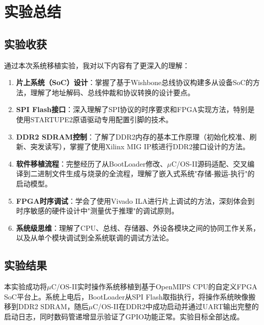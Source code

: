 \section{实验总结}

\subsection{实验收获}

通过本次系统移植实验，我对以下内容有了更深入的理解：

\begin{enumerate}[leftmargin=2em]
    \item \textbf{片上系统（SoC）设计}：掌握了基于Wishbone总线协议构建多从设备SoC的方法，理解了地址解码、总线仲裁和协议转换的设计要点。

    \item \textbf{SPI Flash接口}：深入理解了SPI协议的时序要求和FPGA实现方法，特别是使用STARTUPE2原语驱动专用配置引脚的技术。

    \item \textbf{DDR2 SDRAM控制}：了解了DDR2内存的基本工作原理（初始化校准、刷新、突发读写），掌握了使用Xilinx MIG IP核进行DDR2接口设计的方法。

    \item \textbf{软件移植流程}：完整经历了从BootLoader修改、$\mu$C/OS-II源码适配、交叉编译到二进制文件生成与烧录的全流程，理解了嵌入式系统"存储-搬运-执行"的启动模型。

    \item \textbf{FPGA时序调试}：学会了使用Vivado ILA进行片上调试的方法，深刻体会到时序敏感的硬件设计中"测量优于推理"的调试原则。

    \item \textbf{系统级思维}：理解了CPU、总线、存储器、外设各模块之间的协同工作关系，以及从单个模块调试到全系统联调的调试方法论。
\end{enumerate}

\subsection{实验结果}

本实验成功将$\mu$C/OS-II实时操作系统移植到基于OpenMIPS CPU的自定义FPGA SoC平台上。系统上电后，BootLoader从SPI Flash取指执行，将操作系统映像搬移到DDR2 SDRAM，随后$\mu$C/OS-II在DDR2中成功启动并通过UART输出完整的启动日志，同时数码管递增显示验证了GPIO功能正常。实验目标全部达成。
